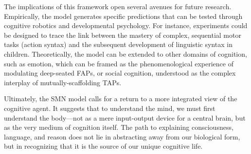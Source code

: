 \documentclass[10pt,letterpaper]{article}
\begin{document}
The implications of this framework open several avenues for future research. Empirically, the model generates specific predictions that can be tested through cognitive robotics and developmental psychology. For instance, experiments could be designed to trace the link between the mastery of complex, sequential motor tasks (action syntax) and the subsequent development of linguistic syntax in children. Theoretically, the model can be extended to other domains of cognition, such as emotion, which can be framed as the phenomenological experience of modulating deep-seated FAPs, or social cognition, understood as the complex interplay of mutually-scaffolding TAPs.

Ultimately, the SMN model calls for a return to a more integrated view of the cognitive agent. It suggests that to understand the mind, we must first understand the body—not as a mere input-output device for a central brain, but as the very medium of cognition itself. The path to explaining consciousness, language, and reason does not lie in abstracting away from our biological form, but in recognizing that it is the source of our unique cognitive life.





\end{document}
